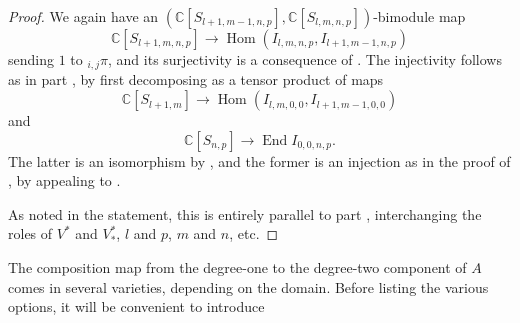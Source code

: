 \documentclass[11pt]{article}
\theoremstyle{plain}
\theoremstyle{nonumberplain}
\theoremstyle{plain}
\numberwithin{equation}{section}
\theoremstyle{nonumberplain}
\newtheorem{proof}{Proof}
\newcommand\bC{{\mathbb C}}
\newcommand\bT{{\mathbb T}}
\newcommand\1{{\bf 1}}
\DeclareMathOperator{\End}{\mathrm{End}}
\DeclareMathOperator{\Hom}{\mathrm{Hom}}
\begin{document}
\begin{proof}
  {} We again have an $(\bC[S_{l+1,m-1,n,p}],\bC[S_{l,m,n,p}])$-bimodule map
  \begin{equation}\label{eq:lml1m1}
    \bC [S_{l+1,m,n,p}] \to \Hom(I_{l,m,n,p},I_{l+1,m-1,n,p})
  \end{equation}
  sending $1$ to ${}_{i,j}\pi$, and its surjectivity is a consequence of . The injectivity follows as in part , by first decomposing  as a tensor product of maps
  \begin{equation*}
    \bC [S_{l+1,m}] \to \Hom(I_{l,m,0,0},I_{l+1,m-1,0,0})
  \end{equation*}
  and
  \begin{equation*}
    \bC [S_{n,p}] \to \End I_{0,0,n,p}. 
  \end{equation*}
  The latter is an isomorphism by , and the former is an injection as in the proof of , by appealing to \cite[Lemma 3.25 (b)]{us0}. 
  
  {} As noted in the statement, this is entirely parallel to part , interchanging the roles of $V^*$ and $V_*^*$, $l$ and $p$, $m$ and $n$, etc.
\end{proof}


The composition map from the degree-one to the degree-two component of $A$ comes in several varieties, depending on the domain. Before listing the various options, it will be convenient to introduce
\end{document}
